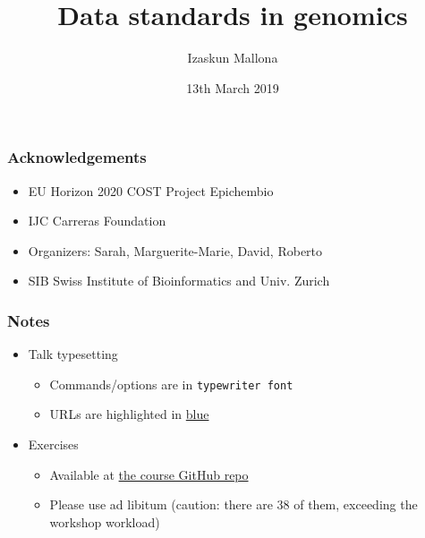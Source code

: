 \documentclass{beamer}
\title{Data standards in genomics}
\institute{COST Project Epichembio - Introduction to NGS data analysis}
\author[izaskun.mallona@sib.swiss]{Izaskun Mallona}
\date{13th March 2019}
\begin{document}
\begin{frame}
  \titlepage
\end{frame}



\begin{frame}
  \frametitle{Acknowledgements}
  \begin{itemize}
  \item EU Horizon 2020 COST Project Epichembio 
  \item IJC Carreras Foundation
  \item Organizers: Sarah, Marguerite-Marie, David, Roberto
  \item SIB Swiss Institute of Bioinformatics and Univ. Zurich
  \end{itemize}
\end{frame}



\begin{frame}
  \frametitle{Notes}
  \begin{itemize}
  \item Talk typesetting
    \begin{itemize}
    \item Commands/options are in \texttt{typewriter font}
    \item URLs are highlighted in \href{https://genome-euro.ucsc.edu/cgi-bin/hgGateway}{blue}
    \end{itemize}
  \item Exercises
    \begin{itemize}
    \item Available at \href{https://github.com/imallona/compbio_data_formats}{the course GitHub repo}
    \item Please use ad libitum (caution: there are 38 of them, exceeding the workshop workload)
    \end{itemize}
  \end{itemize}

\end{frame}

\end{document}
